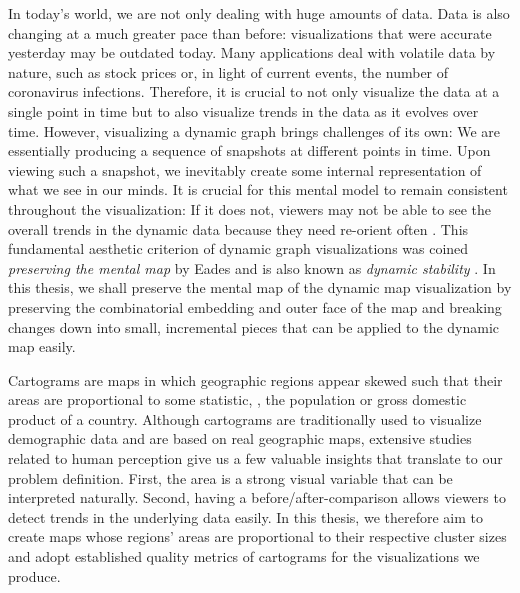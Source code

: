 In today's world, we are not only dealing with huge amounts of data.
Data is also changing at a much greater pace than before: visualizations that were accurate yesterday may be outdated today.
Many applications deal with volatile data by nature, such as stock prices or, in light of current events, the number of coronavirus infections.
Therefore, it is crucial to not only visualize the data at a single point in time but to also visualize trends in the data as it evolves over time.
However, visualizing a dynamic graph brings challenges of its own:
We are essentially producing a sequence of snapshots at different points in time.
Upon viewing such a snapshot, we inevitably create some internal representation of what we see in our minds.
It is crucial for this mental model to remain consistent throughout the visualization:
If it does not, viewers may not be able to see the overall trends in the dynamic data because they need re-orient often \cite{bohringer1990using} \cite{lee2006mental} \cite{purchase2006important}.
This fundamental aesthetic criterion of dynamic graph visualizations was coined \emph{preserving the mental map} by Eades \etal{} \cite{eades1991preserving} \cite{misue1995layout} and is also known as \emph{dynamic stability} \cite{diehl2002graphs}.
In this thesis, we shall preserve the mental map of the dynamic map visualization by preserving the combinatorial embedding and outer face of the map and breaking changes down into small, incremental pieces that can be applied to the dynamic map easily.

Cartograms are maps in which geographic regions appear skewed such that their areas are proportional to some statistic, \eg{}, the population or gross domestic product of a country.
Although cartograms are traditionally used to visualize demographic data and are based on real geographic maps, extensive studies related to human perception \cite{nusrat2016state} \cite{nusrat2018evaluating} give us a few valuable insights that translate to our problem definition.
First, the area is a strong visual variable that can be interpreted naturally.
Second, having a before/after-comparison allows viewers to detect trends in the underlying data easily.
In this thesis, we therefore aim to create maps whose regions' areas are proportional to their respective cluster sizes and adopt established quality metrics of cartograms for the visualizations we produce.


